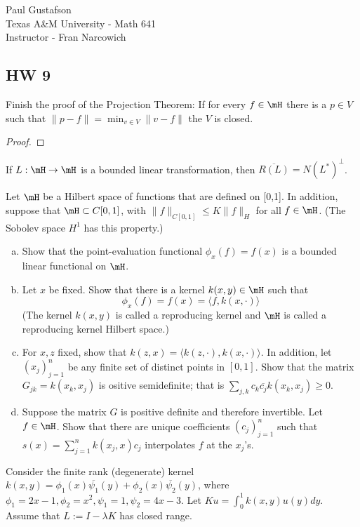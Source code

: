 \documentclass{article}
\begin{document}
\noindent Paul Gustafson\\
\noindent Texas A\&M University - Math 641\\ 
\noindent Instructor - Fran Narcowich

\subsection*{HW 9}
 Finish the proof of the Projection Theorem: If for every $f \in \mH$ there is a $p \in V$ such that $\|p - f\| = \min_{v \in V} \|v - f\|$ the $V$ is closed.

\begin{proof}
\end{proof}


 If $L : \mH \to \mH$ is a bounded linear transformation, then $\overline{R(L)} = N (L^*)^\perp$.

 Let $\mH$ be a Hilbert space of functions that are defined on [0,1]. In addition, suppose that $\mH \subset C[0,1]$, with $\|f\|_{C[0,1]} \le K \|f \|_H$ for all $f \in \mH$. (The Sobolev space $H^1$ has this property.)

\begin{enumerate}[a.]
\item Show that the point-evaluation functional $\phi_x(f) = f(x)$ is a bounded linear functional on $\mH$.
\item Let $x$ be fixed. Show that there is a kernel $k(x,y) \in \mH$ such that 
$$ \phi_x(f) = f(x) = \langle f , k(x, \cdot) \rangle$$
(The kernel $k(x,y)$ is called a reproducing kernel and $\mH$ is called a reproducing kernel Hilbert space.)
\item For $x, z$ fixed, show that $k(z,x) = \langle k(z, \cdot), k(x, \cdot) \rangle$. In addition, let $(x_j)_{j=1}^n$ be any finite set of distinct points in $[0,1]$.  Show that the matrix $G_{jk} = k(x_k, x_j)$ is ositive semidefinite; that is $\sum_{j,k} c_k \overline{c_j} k(x_k, x_j) \ge 0$.
\item Suppose the matrix $G$ is positive definite and therefore invertible. Let $f \in \mH$. Show that there are unique coefficients $(c_j)_{j=1}^n$ such that $s(x) = \sum_{j=1}^n k(x_j, x) c_j$ interpolates $f$ at the $x_j$'s.
\end{enumerate}

 Consider the finite rank (degenerate) kernel $k(x,y) = \phi_1(x) \overline{\psi_1}(y) + \phi_2(x) \overline{\psi_2} (y)$, where $\phi_1 = 2x - 1, \phi_2 = x^2, \psi_1 = 1, \psi_2 = 4x - 3$. Let $Ku = \int_0^1 k(x,y) u(y) dy$. Assume that $L:= I - \lambda K$ has closed range.
\end{document}
